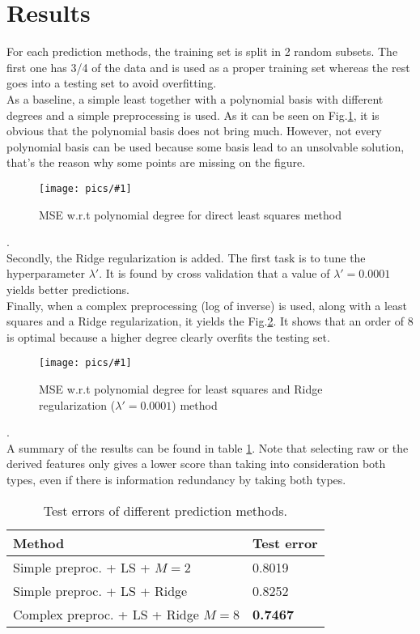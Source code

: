 \documentclass[10pt,conference,compsocconf]{IEEEtran}
\newcommand{\scalefig}[4]{
  \begin{figure}[ht!]
    \centering
    \texttt{[image: pics/\#1]}
 \caption{#3}
    \label{#4}
  \end{figure}}
\begin{document}
\section{Results}
For each prediction methods, the training set is split in 2 random subsets. The first one has 3/4 of the data and is used as a proper training set whereas the rest goes into a testing set to avoid overfitting.\\
As a baseline, a simple least together with a polynomial basis with different degrees and a simple preprocessing is used. As it can be seen on Fig.\ref{fig:cross_validation_least_poly}, it is obvious that the polynomial basis does not bring much. However, not every polynomial basis can be used because some basis lead to an unsolvable solution, that's the reason why some points are missing on the figure.
\scalefig{cross_validation_least_poly}{1}{MSE w.r.t polynomial degree for direct least squares method}{fig:cross_validation_least_poly}.\\
Secondly, the Ridge regularization is added. The first task is to tune the hyperparameter $\lambda'$. It is found by cross validation that a value of $\lambda' = 0.0001$ yields better predictions.\\
Finally, when a complex preprocessing (log of inverse) is used, along with a least squares and a Ridge regularization, it yields the Fig.\ref{fig:bestfig}. It shows that an order of 8 is optimal because a higher degree clearly overfits the testing set.
\scalefig{MINIMUM_cross_validation_Ridge_poly_00001_with_log}{1}{MSE w.r.t polynomial degree for least squares and Ridge regularization ($\lambda' = 0.0001$) method}{fig:bestfig}.\\
A summary of the results can be found in table \ref{tab:results}.
Note that selecting raw or the derived features only gives a lower score than taking into consideration both types, even if there is information redundancy by taking both types. 
\begin{table} [htbp]
  \centering
  \begin{tabular}[c]{|l|l|}
    \hline
    Method & Test error\\
    \hline
    Simple preproc. + LS + $M=2$ &0.8019\\
    Simple preproc. + LS + Ridge & 0.8252\\
    Complex preproc. + LS + Ridge $M=8$ & \textbf{0.7467}\\
    \hline
  \end{tabular}
  \caption{Test errors of different prediction methods.}
  \label{tab:results}
\end{table}
\end{document}
